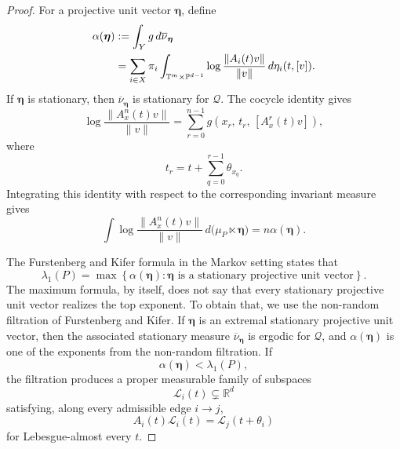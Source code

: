 \documentclass[11pt,a4paper]{amsart}
\newcommand{\T}{\mathbb T}
\newcommand{\R}{\mathbb R}
\newcommand{\PP}{\mathbb P}
\begin{document}
\begin{proof}
For a projective unit vector \(\boldsymbol\eta\), define 
\begin{align}
 \alpha(\boldsymbol\eta)
 &:=
 \int_Y g\,d\overline\nu_{\boldsymbol\eta}
 \notag\\
 &=
 \sum_{i\in X}\pi_i
 \int_{\T^m\times\PP^{d-1}}
 \log\frac{\|A_i(t)v\|}{\|v\|}
 \,d\eta_i(t, [v]).
 \label{eq:Furstenberg-functional-vector}
\end{align}
If \(\boldsymbol\eta\) is stationary, then
\(\overline\nu_{\boldsymbol\eta}\) is stationary for \(\mathcal Q\).
The cocycle identity gives
\[
 \log
 \frac{\|A_x^n(t)v\|}{\|v\|}
 =
 \sum_{r=0}^{n-1}
 g\left(
 x_r,\,
 t_r,\,
 [A_x^r(t)v]
 \right),
\]
where
\[
 t_r=t+\sum_{q=0}^{r-1}\theta_{x_q}.
\]
Integrating this identity with respect to the corresponding invariant
measure gives
\begin{equation}\label{eq:integrated-n-step-projective-expansion}
 \int
 \log\frac{\|A_x^n(t)v\|}{\|v\|}
 \,d\bigl(\mu_P\ltimes\boldsymbol\eta\bigr)
 =
 n\alpha(\boldsymbol\eta).
\end{equation}

The Furstenberg and Kifer formula in the Markov setting
states that
\begin{equation}\label{eq:Furstenberg-formula-projective-vectors}
 \lambda_1(P)
 =
 \max\left\{
 \alpha(\boldsymbol\eta):
 \boldsymbol\eta
 \text{ is a stationary projective unit vector}
 \right\}.
\end{equation}
The maximum formula, by itself, does not say that
every stationary projective unit vector realizes the top exponent. To obtain that, we use the non-random filtration of Furstenberg and Kifer.  If
\(\boldsymbol\eta\) is an extremal stationary projective unit vector,
then the associated stationary measure
\(\overline\nu_{\boldsymbol\eta}\) is ergodic for \(\mathcal Q\), and
\(\alpha(\boldsymbol\eta)\) is one of the exponents from the
non-random filtration.  If
\[
 \alpha(\boldsymbol\eta)<\lambda_1(P),
\]
the filtration produces a proper measurable family of subspaces
\[
 \mathcal L_i(t)\subsetneq\R^d
\]
satisfying, along every admissible edge \(i\to j\),
\begin{equation}\label{eq:lower-filtration-invariant-family}
 A_i(t)\mathcal L_i(t)
 =
 \mathcal L_j(t+\theta_i)
\end{equation}
for Lebesgue-almost every \(t\).


\end{proof}
\end{document}
